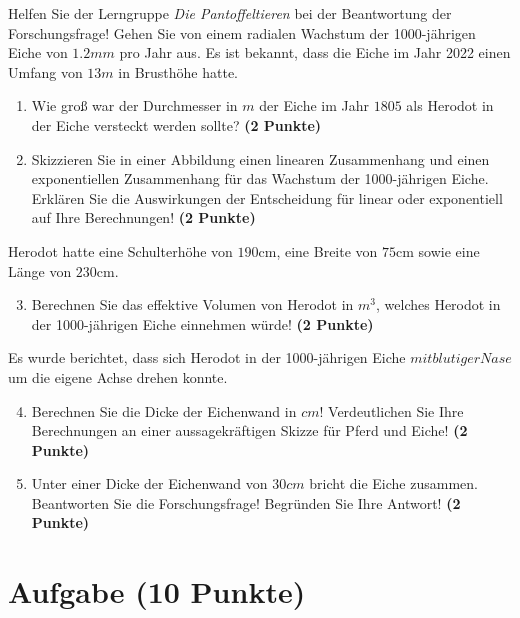 \documentclass[a4paper, 9pt]{scrartcl}\usepackage[]{graphicx}\usepackage[]{xcolor}
\begin{document}
\vspace{1Ex}

Helfen Sie der Lerngruppe \textit{Die Pantoffeltieren} bei der Beantwortung der Forschungsfrage! Gehen Sie von einem radialen Wachstum der 1000-jährigen Eiche von $1.2mm$ pro Jahr aus. Es ist bekannt, dass die Eiche im Jahr 2022 einen Umfang von $13m$ in Brusthöhe hatte.

\begin{enumerate}
\item Wie groß war der Durchmesser in $m$ der Eiche im Jahr $1805$ als Herodot in der Eiche versteckt werden sollte? \textbf{(2 Punkte)}
\item Skizzieren Sie in einer Abbildung einen linearen Zusammenhang und einen exponentiellen Zusammenhang für das Wachstum der 1000-jährigen Eiche. Erklären Sie die Auswirkungen der Entscheidung für linear oder exponentiell auf Ihre Berechnungen! \textbf{(2 Punkte)}
\end{enumerate}
 
Herodot hatte eine Schulterhöhe von $190$cm, eine Breite von $75$cm sowie eine Länge von  $230$cm.

\begin{enumerate}
  \setcounter{enumi}{2}
\item Berechnen Sie das effektive Volumen von Herodot in $m^3$, welches Herodot in der 1000-jährigen Eiche einnehmen würde! \textbf{(2 Punkte)}
\end{enumerate}

Es wurde berichtet, dass sich Herodot in der 1000-jährigen Eiche $mit blutiger Nase$ um die eigene Achse drehen konnte.

\begin{enumerate}
  \setcounter{enumi}{3}
\item Berechnen Sie die Dicke der Eichenwand in $cm$! Verdeutlichen Sie Ihre Berechnungen an einer aussagekräftigen Skizze für Pferd und Eiche! \textbf{(2 Punkte)} 
\item Unter einer Dicke der Eichenwand von $30cm$ bricht die Eiche zusammen. Beantworten Sie die Forschungsfrage! Begründen Sie Ihre Antwort! \textbf{(2 Punkte)} 
\end{enumerate}
 
\clearpage

\section{Aufgabe \hfill (10 Punkte)}
\end{document}
